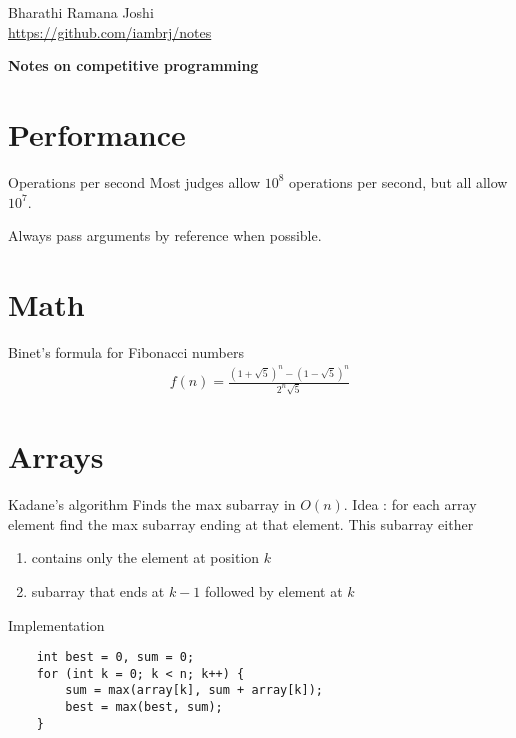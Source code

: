 \documentclass[titlepage, 12pt]{book}
\begin{document}
\begin{titlepage}

	\raggedleft

	\vspace*{\baselineskip}

	{Bharathi Ramana Joshi\\\url{https://github.com/iambrj/notes}}

	\vspace*{0.167\textheight}

	\textbf{\LARGE Notes on competitive programming}\\[\baselineskip]

	\vfill

	\vspace*{3\baselineskip}

\end{titlepage}

\newpage

\tableofcontents

\chapter{Performance}

\begin{definition}{Operations per second}{}
    Most judges allow $10^8$ operations per second, but all allow $10^7$.
\end{definition}

Always pass arguments by reference when possible.

\chapter{Math}

\begin{definition}{Binet's formula for Fibonacci numbers}{}
    \begin{align*}
        f(n) = \frac{(1 + \sqrt{5}) ^ n - (1 - \sqrt{5}) ^ n}{2^n\sqrt{5}}
    \end{align*}
\end{definition}

\chapter{Arrays}

\begin{algorithm}{Kadane's algorithm}{}
    Finds the max subarray in $O(n)$. Idea : for each array element find the max
    subarray ending at that element. This subarray either
    \begin{enumerate}
        \item contains only the element at position $k$
        \item subarray that ends at $k - 1$ followed by element at $k$
    \end{enumerate}
    Implementation
    \begin{verbatim}
    int best = 0, sum = 0;
    for (int k = 0; k < n; k++) {
        sum = max(array[k], sum + array[k]);
        best = max(best, sum);
    }
    \end{verbatim}
\end{algorithm}
\end{document}
